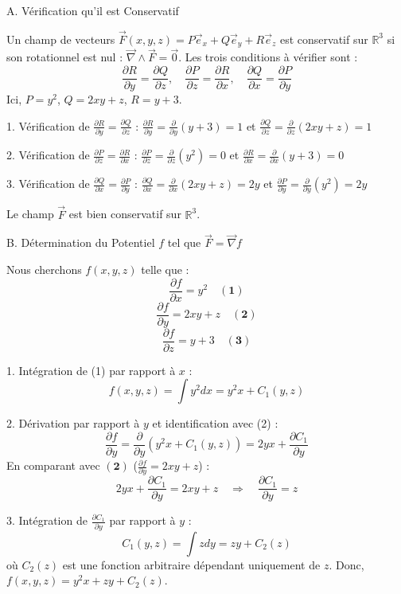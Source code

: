 \documentclass[french]{yLectureNote}
\renewcommand{\vec}{\overrightarrow}
\begin{document}
A. Vérification qu'il est Conservatif

Un champ de vecteurs $\vec{F}(x,y,z) = P\vec{e}_{x} + Q\vec{e}_{y} + R\vec{e}_{z}$ est conservatif sur $\mathbb{R}^3$ si son rotationnel est nul : $\vec{\nabla} \wedge \vec{F} = \vec{0}$.
Les trois conditions à vérifier sont :
$$
\frac{\partial R}{\partial y} = \frac{\partial Q}{\partial z}, \quad \frac{\partial P}{\partial z} = \frac{\partial R}{\partial x}, \quad \frac{\partial Q}{\partial x} = \frac{\partial P}{\partial y}
$$
Ici, $P = y^2$, $Q = 2xy+z$, $R = y+3$.

1.  Vérification de $\frac{\partial R}{\partial y} = \frac{\partial Q}{\partial z}$ :
     $\frac{\partial R}{\partial y} = \frac{\partial}{\partial y}(y+3) = 1$ et $\frac{\partial Q}{\partial z} = \frac{\partial}{\partial z}(2xy+z) = 1$

2.  Vérification de $\frac{\partial P}{\partial z} = \frac{\partial R}{\partial x}$ :
    $\frac{\partial P}{\partial z} = \frac{\partial}{\partial z}(y^2) = 0$ et $\frac{\partial R}{\partial x} = \frac{\partial}{\partial x}(y+3) = 0$

3.  Vérification de $\frac{\partial Q}{\partial x} = \frac{\partial P}{\partial y}$ :
    $\frac{\partial Q}{\partial x} = \frac{\partial}{\partial x}(2xy+z) = 2y$ et $\frac{\partial P}{\partial y} = \frac{\partial}{\partial y}(y^2) = 2y$

Le champ $\vec{F}$ est bien conservatif sur $\mathbb{R}^3$.

B. Détermination du Potentiel $f$ tel que $\vec{F} = \vec{\nabla}f$

Nous cherchons $f(x,y,z)$ telle que :
$$
\frac{\partial f}{\partial x} = y^2 \quad \mathbf{(1)}
$$
$$
\frac{\partial f}{\partial y} = 2xy+z \quad \mathbf{(2)}
$$
$$
\frac{\partial f}{\partial z} = y+3 \quad \mathbf{(3)}
$$

1.  Intégration de (1) par rapport à $x$ :
    $$
    f(x,y,z) = \int y^2 dx = y^2x + C_1(y,z)
    $$

2.  Dérivation par rapport à $y$ et identification avec (2) :
    $$
    \frac{\partial f}{\partial y} = \frac{\partial}{\partial y}(y^2x + C_1(y,z)) = 2yx + \frac{\partial C_1}{\partial y}
    $$
    En comparant avec $\mathbf{(2)}$ ($\frac{\partial f}{\partial y} = 2xy+z$) :
    $$
    2yx + \frac{\partial C_1}{\partial y} = 2xy+z \quad \Rightarrow \quad \frac{\partial C_1}{\partial y} = z
    $$

3.  Intégration de $\frac{\partial C_1}{\partial y}$ par rapport à $y$ :
    $$
    C_1(y,z) = \int z dy = zy + C_2(z)
    $$
    où $C_2(z)$ est une fonction arbitraire dépendant uniquement de $z$.
    Donc, $f(x,y,z) = y^2x + zy + C_2(z)$.
\end{document}

